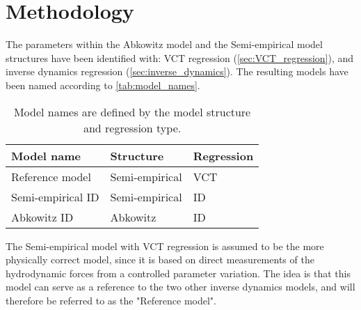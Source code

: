 \section{Methodology}
\label{sec:methodology}
The parameters within the Abkowitz model and the Semi-empirical model structures have been identified with: VCT regression (\autoref{sec:VCT_regression}), and inverse dynamics regression (\autoref{sec:inverse_dynamics}). The resulting models have been named according to \autoref{tab:model_names}.
\begin{table}[h!]
    \caption{Model names are defined by the model structure and regression type.}
    \label{tab:model_names}
    \centering
    \begin{tabular}{l l l}
        Model name & Structure & Regression \\
        \hline
        Reference model & Semi-empirical & VCT \\
        Semi-empirical ID & Semi-empirical & ID \\
        Abkowitz ID & Abkowitz & ID \\
    \end{tabular}
\end{table}
The Semi-empirical model with VCT regression is assumed to be the more physically correct model, since it is based on direct measurements of the hydrodynamic forces from a controlled parameter variation. The idea is that this model can serve as a reference to the two other inverse dynamics models, and will therefore be referred to as the "Reference model".

